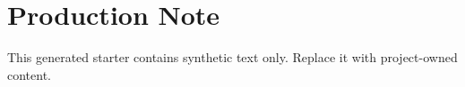 \documentclass[10pt,twoside,openany]{book}
\begin{document}
\PSEBeginFrontMatter
\PSETitlePage
\PSEPublicationPage
\tableofcontents
\clearpage
\PSEBeginBody

\PSEBeginBackMatter
\chapter*{Production Note}
This generated starter contains synthetic text only. Replace it with project-owned content.
\end{document}
